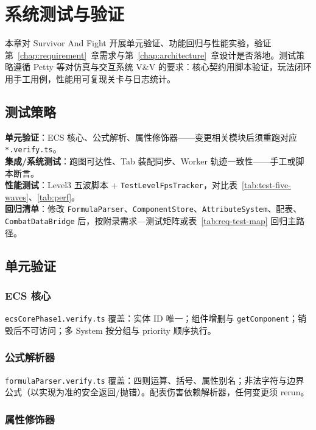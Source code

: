 \chapter{系统测试与验证}
\label{chap:test}

本章对 Survivor And Fight 开展单元验证、功能回归与性能实验，验证第~\ref{chap:requirement}~章需求与第~\ref{chap:architecture}~章设计是否落地。测试策略遵循 Petty 等对仿真与交互系统 V\&V 的要求\cite{petty2010vv,oberkampf2010vv}：核心契约用脚本验证，玩法闭环用手工用例，性能用可复现关卡与日志统计。

\section{测试策略}

\textbf{单元验证}：ECS 核心、公式解析、属性修饰器——变更相关模块后须重跑对应 \texttt{*.verify.ts}。\\
\textbf{集成/系统测试}：跑图可达性、Tab 装配同步、Worker 轨迹一致性——手工或脚本断言。\\
\textbf{性能测试}：Level3 五波脚本 + \texttt{TestLevelFpsTracker}，对比表~\ref{tab:test-five-waves}、\ref{tab:perf}。\\
\textbf{回归清单}：修改 \texttt{FormulaParser}、\texttt{ComponentStore}、\texttt{AttributeSystem}、配表、\texttt{CombatDataBridge} 后，按附录需求—测试矩阵或表~\ref{tab:req-test-map} 回归主路径。

\section{单元验证}

\subsection{ECS 核心}

\texttt{ecsCorePhase1.verify.ts} 覆盖：实体 ID 唯一；组件增删与 \texttt{getComponent}；销毁后不可访问；多 System 按分组与 priority 顺序执行\cite{petty2010vv}。

\subsection{公式解析器}

\texttt{formulaParser.verify.ts} 覆盖：四则运算、括号、属性别名；非法字符与边界公式（以实现为准的安全返回/抛错）。配表伤害依赖解析器，任何变更须 rerun。

\subsection{属性修饰器}

